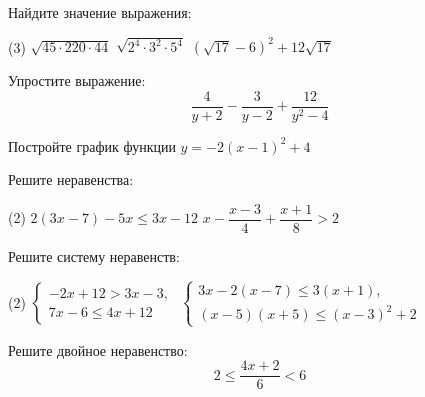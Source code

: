 \begin{exam}
	\begin{listofex}
		\item Найдите значение выражения:
		\begin{tasks}(3)
			\task \( \sqrt{45\cdot220\cdot44} \)
			\task \( \sqrt{2^4\cdot3^2\cdot5^4} \)
			\task \( (\sqrt{17}-6)^2+12\sqrt{17} \)
		\end{tasks}
		\item Упростите выражение:
		\[\dfrac{4}{y+2}-\dfrac{3}{y-2}+\dfrac{12}{y^2-4}\]
		\item Постройте график функции \( y=-2(x-1)^2+4 \)
		\item Решите неравенства:
		\begin{tasks}(2)
			\task \( 2(3x-7)-5x\leq3x-12 \)
			\task \( x-\dfrac{x-3}{4}+\dfrac{x+1}{8}>2 \)
		\end{tasks}
		\item Решите систему неравенств:
		\begin{tasks}(2)
			\task \( \left\{
			\begin{array}{l}
				-2x+12>3x-3,\\
				7x-6\leq4x+12
			\end{array}
			\right. \)
			\task \( \left\{
			\begin{array}{l}
				3x-2(x-7)\leq3(x+1),\\
				(x-5)(x+5)\leq(x-3)^2+2
			\end{array}
			\right. \)
		\end{tasks}
		\item Решите двойное неравенство:
		\[ 2\leq\dfrac{4x+2}{6}<6\] 
	\end{listofex}
\end{exam}

